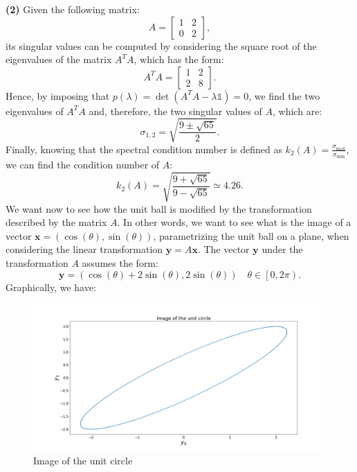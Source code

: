 \documentclass[a4paper,11pt]{article}
\begin{document}
\noindent \textbf{(2)} Given the following matrix:
\begin{equation}
	A = \begin{bmatrix}
		1 & 2 \\
		0 & 2
	\end{bmatrix},
\end{equation}
its singular values can be computed by considering the square root of the eigenvalues of the matrix $A^{T}A$, which has the form:
\begin{equation}
	A^{T}A = \begin{bmatrix}
		1 & 2 \\
		2 & 8
	\end{bmatrix}.
\end{equation}
Hence, by imposing that $p(\lambda)=\det(A^{T}A -\lambda\mathbb{1})=0$, we find the two eigenvalues of $A^{T}A$ and, therefore, the two singular values of $A$, which are:
\begin{equation}
	\sigma_{1,2}=\sqrt{\frac{9 \pm \sqrt{65}}{2}}.
\end{equation}
Finally, knowing that the spectral condition number is defined as $k_{2}(A) = \frac{\sigma_{\max}}{\sigma_{\min}}$, we can find the condition number of $A$:
\begin{equation}
	k_{2}(A) = \sqrt{\frac{9+\sqrt{65}}{9-\sqrt{65}}} \simeq 4.26.
\end{equation}
We want now to see how the unit ball is modified by the transformation described by the matrix $A$. In other words, we want to see what is the image of a vector $\textbf{x}=(\cos(\theta),\sin(\theta))$, parametrizing the unit ball on a plane, when considering the linear transformation $\textbf{y}=A\textbf{x}$. The vector $\textbf{y}$ under the transformation $A$ assumes the form:
\[\textbf{y}=(\cos(\theta) + 2\sin(\theta), 2\sin(\theta)) \quad \theta \in \left[0,2\pi\right).\]
Graphically, we have:
\begin{figure}[H]
	\centering
	\includegraphics[scale=0.25]{Plot/Image_unit_circle}
	\caption{Image of the unit circle}
	\label{fig:Image_unit_circle}
\end{figure}
\end{document}
